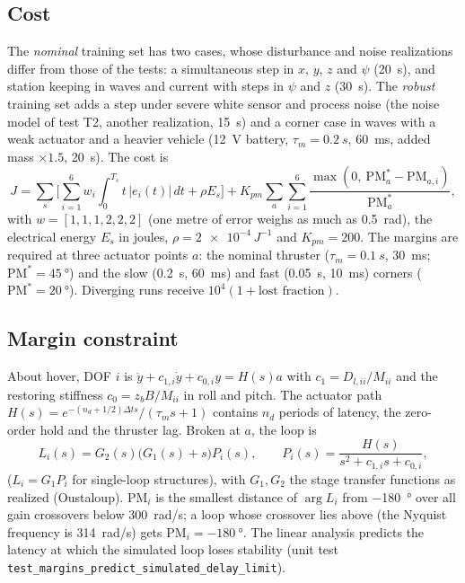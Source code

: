 \documentclass[review,12pt]{elsarticle}
\begin{document}
\subsection{Cost}
The \emph{nominal} training set has two cases, whose disturbance and noise realizations differ from those of
the tests: a simultaneous step in $x$, $y$, $z$ and $\psi$ (\SI{20}{s}), and station keeping in waves and
current with steps in $\psi$ and $z$ (\SI{30}{s}). The \emph{robust} training set adds a step under severe
white sensor and process noise (the noise model of test T2, another realization, \SI{15}{s}) and a corner case
in waves with a weak actuator and a heavier vehicle (\SI{12}{V} battery, $\tau_m=\SI{0.2}{s}$, \SI{60}{ms},
added mass $\times1.5$, \SI{20}{s}). The cost is
\begin{equation}\label{eq:cost}
  J = \sum_{s}\Big[\sum_{i=1}^{6} w_i\int_0^{T_s} t\,|e_i(t)|\,dt + \rho E_s\Big]
      + K_{pm}\sum_{a}\sum_{i=1}^{6}\frac{\max(0,\ \mathrm{PM}_a^\ast-\mathrm{PM}_{a,i})}{\mathrm{PM}_a^\ast},
\end{equation}
with $w=[1,1,1,2,2,2]$ (one metre of error weighs as much as \SI{0.5}{rad}), the electrical energy $E_s$ in
joules, $\rho=\num{2e-4}\,\si{J^{-1}}$ and $K_{pm}=200$. The margins are required at three actuator points $a$:
the nominal thruster ($\tau_m=\SI{0.1}{s}$, \SI{30}{ms}; $\mathrm{PM}^\ast=\SI{45}{\degree}$) and the slow
(\SI{0.2}{s}, \SI{60}{ms}) and fast (\SI{0.05}{s}, \SI{10}{ms}) corners ($\mathrm{PM}^\ast=\SI{20}{\degree}$).
Diverging runs receive $10^4(1+\text{lost fraction})$.

\subsection{Margin constraint}
About hover, DOF $i$ is $\ddot y + c_{1,i}\dot y + c_{0,i}y = H(s)a$ with $c_1=D_{l,ii}/M_{ii}$ and the
restoring stiffness $c_0=z_bB/M_{ii}$ in roll and pitch. The actuator path
$H(s)=e^{-(n_d+1/2)\Delta t s}/(\tau_m s+1)$ contains $n_d$ periods of latency, the zero-order hold and the
thruster lag. Broken at $a$, the loop is
\begin{equation}
  L_i(s) = G_2(s)\big(G_1(s)+s\big)P_i(s), \qquad P_i(s) = \frac{H(s)}{s^2+c_{1,i}s+c_{0,i}},
\end{equation}
($L_i=G_1P_i$ for single-loop structures), with $G_1,G_2$ the stage transfer functions as realized
(Oustaloup). $\mathrm{PM}_i$ is the smallest distance of $\arg L_i$ from \SI{-180}{\degree} over all gain
crossovers below \SI{300}{rad/s}; a loop whose crossover lies above (the Nyquist frequency is
\SI{314}{rad/s}) gets $\mathrm{PM}_i=\SI{-180}{\degree}$. The linear analysis predicts the latency at which
the simulated loop loses stability (unit test \texttt{test\_margins\_predict\_simulated\_delay\_limit}).
\end{document}

